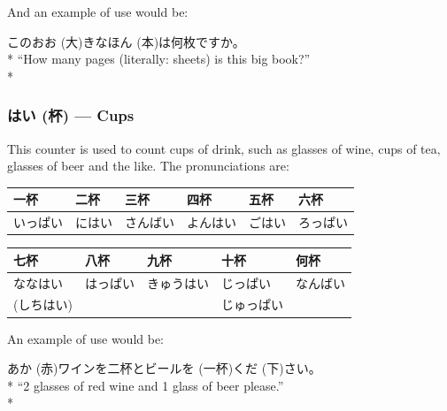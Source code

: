 \documentclass[11pt, b5paper, twoside, openright, onecolumn]{book}
\makeatletter
\newcommand*{\rubystack}[2]{{\relscale{0.5}%
  \begin{tabular}[b]{@{}c@{}}%
    {#1}\\%
   {\textscale{2}{#2}}%
  \end{tabular}}%
}
\DeclareRobustCommand*{\ruby}[2]{%
  \mbox{%
    \setlength{\parskip}{0ex}%
    \BeginAccSupp{method=pdfstringdef,ActualText={#1}}%
      \rubystack{\phantom{#2}}{#1}%
      \llap{%
        \rubystack{#2}{\phantom{#1}}%
      }%
    \EndAccSupp{}%
  }%
}
\renewcommand*{\ruby}[2]{#2 (#1)}%
\newenvironment{exampleblock}{
\setlength{\parindent}{0.6in}
\begin{minipage}[t]{\dimexpr\textwidth-\parindent}}
{\end{minipage}}
\newenvironment{mytabular}[1]{\noindent\hspace{0.4in}
\begin{tabular}[h]{#1}}{\end{tabular}}
\makeatother
\begin{document}
And an example of use would be:

\vspace{0.4cm}
\begin{exampleblock}
この\ruby{大}{おお}きな\ruby{本}{ほん}は何枚ですか。 \\* 
“How many pages (literally: sheets) is this big book?” \\* 
\end{exampleblock}
\subsubsection{\ruby{杯}{はい} — Cups}


This counter is used to count cups of drink‚ such as glasses of wine‚ cups of tea‚ glasses of beer and the like. The pronunciations are:

\vspace{0.5cm}
\smaller
\begin{mytabular}{| l  l  l  l  l  l |}\hline 
\rule{0pt}{2.4ex}一杯 & 二杯 & 三杯 & 四杯 & 五杯 & 六杯\\ 
\hline
\rule{0pt}{2.4ex}いっぱい & にはい & さんばい & よんはい & ごはい & ろっぱい\\ 
\hline 
\end{mytabular}
\larger
\vspace{0.5cm}

\smaller
\begin{mytabular}{| l  l  l  l  l |}\hline 
\rule{0pt}{2.4ex}七杯 & 八杯 & 九杯 & 十杯 & 何杯\\ 
\hline
\rule{0pt}{2.4ex}ななはい & はっぱい & きゅうはい & じっぱい & なんばい\\ 
\rule{0pt}{2.4ex}(しちはい) &  &  & じゅっぱい & \\ 
\hline 
\end{mytabular}
\larger
\vspace{0.5cm}


An example of use would be:

\vspace{0.4cm}
\begin{exampleblock}
\ruby{赤}{あか}ワインを二杯とビールを\ruby{一杯}{}\ruby{下}{くだ}さい。 \\* 
“2 glasses of red wine and 1 glass of beer please.” \\* 
\end{exampleblock}
\vspace{0.2cm}
\end{document}
